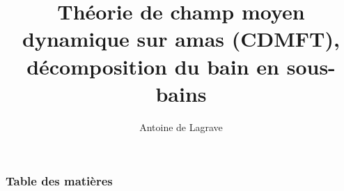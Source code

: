 \documentclass{beamer}
\title[Théorie des groupes]
{Théorie de champ moyen dynamique sur amas (CDMFT), décomposition du bain en sous-bains}
\author{Antoine de Lagrave}
\institute[]{
    Sommaire projet de maîtrise \\
    Département de physique \\
    UDS / UQTR
}
\date[\today]
\begin{document}

    \frame{\titlepage}

    

    \begin{frame}
        \frametitle{Table des matières}
        \tableofcontents
    \end{frame}

    

    

    
\end{document}
